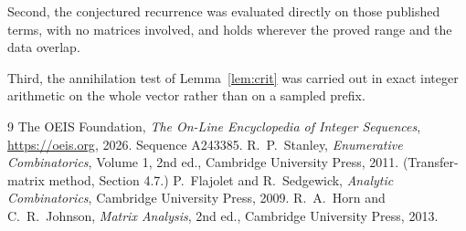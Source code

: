 \documentclass[11pt,a4paper]{article}
\theoremstyle{plain}
\theoremstyle{definition}
\begin{document}
Second, the conjectured recurrence was evaluated directly on those published terms, with no
matrices involved, and holds wherever the proved range and the data overlap.

Third, the annihilation test of Lemma~\ref{lem:crit} was carried out in exact integer
arithmetic on the whole vector rather than on a sampled prefix.

\begin{thebibliography}{9}
 The OEIS Foundation, \emph{The On-Line Encyclopedia of Integer
Sequences}, \url{https://oeis.org}, 2026. Sequence A243385.
 R.~P.~Stanley, \emph{Enumerative Combinatorics}, Volume 1, 2nd ed.,
Cambridge University Press, 2011. (Transfer-matrix method, Section 4.7.)
 P.~Flajolet and R.~Sedgewick, \emph{Analytic Combinatorics}, Cambridge
University Press, 2009.
 R.~A.~Horn and C.~R.~Johnson, \emph{Matrix Analysis}, 2nd ed., Cambridge
University Press, 2013.
\end{thebibliography}
\end{document}

